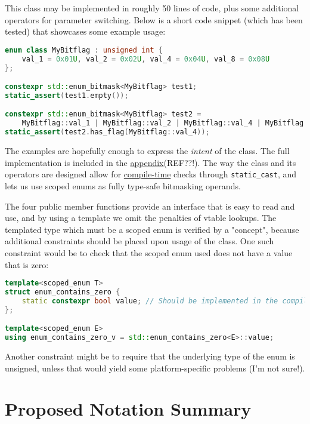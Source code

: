 \documentclass[
  format=manuscript,
  screen=true,
  review=false,
  nonacm=true,
  timestamp=true,
  balance=false]{acmart}
\newcommand{\beforecodespace}{\vspace{4mm}}
\begin{document}
This class may be implemented in roughly 50 lines of code, plus some additional
operators for parameter switching. Below is a short code snippet (which has been
tested) that showcases some example usage:

\beforecodespace\begin{lstlisting}[language=Cpp]
enum class MyBitflag : unsigned int {
    val_1 = 0x01U, val_2 = 0x02U, val_4 = 0x04U, val_8 = 0x08U
};

constexpr std::enum_bitmask<MyBitflag> test1;
static_assert(test1.empty());

constexpr std::enum_bitmask<MyBitflag> test2 =
    MyBitflag::val_1 | MyBitflag::val_2 | MyBitflag::val_4 | MyBitflag::val_8;
static_assert(test2.has_flag(MyBitflag::val_4));
\end{lstlisting}


\noindent
The examples are hopefully enough to express the \textit{intent} of the class.
The full implementation is included in the \underline{appendix}(REF??!).
The way the class and its operators are designed allow for \underline{compile-time}
checks through \texttt{static\_cast}, and lets us use scoped enums as fully type-safe
bitmasking operands.

The four public member functions
provide an interface that is easy to read and use, and by using a template we omit
the penalties of vtable lookups. The templated type which must be a scoped enum is
verified by a "concept", because additional constraints should be placed upon usage
of the class. One such constraint would be to check that the scoped enum used does
not have a value that is zero:

\beforecodespace\begin{lstlisting}[language=Cpp]
template<scoped_enum T>
struct enum_contains_zero {
    static constexpr bool value; // Should be implemented in the compiler!
};

template<scoped_enum E>
using enum_contains_zero_v = std::enum_contains_zero<E>::value;
\end{lstlisting}

\noindent
Another constraint might be to require that the underlying type of the enum is
unsigned, unless that would yield some platform-specific problems (I'm not sure!).





\section{Proposed Notation Summary}
\end{document}
